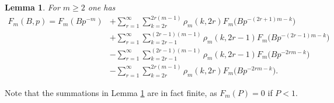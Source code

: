 \documentclass[11pt]{article}
\numberwithin{equation}{section}
\newtheorem{lemma}[theorem]{Lemma}
\theoremstyle{definition}
\numberwithin{theorem}{section}
\begin{document}
\begin{lemma}\label{lem5}
For $m\geq 2$ one has
\begin{equation*}
\begin{split}
F_m(B,p) = F_m(Bp^{-m}) &+\sum_{r=1}^{\infty} \sum_{k=2r}^{2r(m-1)}\rho_m(k,2r)F_m\bigl(Bp^{-(2r+1)m-k}\bigr)\\
&+ \sum_{r=1}^\infty\sum_{k=2r-1}^{(2r-1)(m-1)}\rho_m(k,2r-1)F_m\bigl(Bp^{-(2r-1)m-k}\bigr)\\
&-\sum_{r=1}^\infty \sum_{k=2r-1}^{(2r-1)(m-1)}\rho_m(k,2r-1)F_m\bigl(Bp^{-2rm-k}\bigr)\\
&-\sum_{r=1}^\infty\sum_{k=2r}^{2r(m-1)}\rho_m(k,2r)F_m\bigl(Bp^{-2rm-k}\bigr).
\end{split}
\end{equation*}

\end{lemma}

Note that the summations in Lemma \ref{lem5} are in fact finite, as $F_m(P)=0$ if $P<1$.
\end{document}
